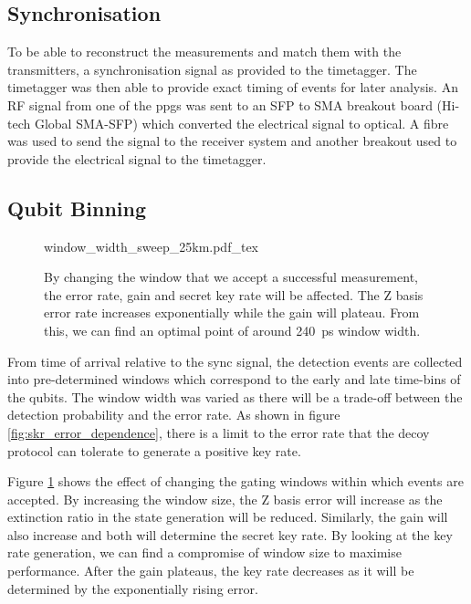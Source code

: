 
\subsection{Synchronisation}

To be able to reconstruct the measurements and match them with the transmitters, a synchronisation signal as provided to the timetagger. The timetagger was then able to provide exact timing of events for later analysis. An RF signal from one of the \acp{ppg} was sent to an SFP to SMA breakout board (Hi-tech Global SMA-SFP) which converted the electrical signal to optical. A fibre was used to send the signal to the receiver system and another breakout used to provide the electrical signal to the timetagger. 

\subsection{Qubit Binning}

\begin{figure}[t]
	\centering
	\tiny
	\def\svgwidth{\textwidth} 
	{window_width_sweep_25km.pdf_tex}
	\caption[Error, gain and key rate dependence on bin width]{By changing the window that we accept a successful measurement, the error rate, gain and secret key rate will be affected. The Z basis error rate increases exponentially while the gain will plateau. From this, we can find an optimal point of around \SI{240}{\ps} window width.}
	\label{fig:window_sweep}
\end{figure}

From time of arrival relative to the sync signal, the detection events are collected into pre-determined windows which correspond to the early and late time-bins of the qubits. The window width was varied as there will be a trade-off between the detection probability and the error rate. As shown in figure \ref{fig:skr_error_dependence}, there is a limit to the error rate that the decoy protocol can tolerate to generate a positive key rate.

Figure \ref{fig:window_sweep} shows the effect of changing the gating windows within which events are accepted. By increasing the window size, the Z basis error will increase as the extinction ratio in the state generation will be reduced. Similarly, the gain will also increase and both will determine the secret key rate. By looking at the key rate generation, we can find a compromise of window size to maximise performance. After the gain plateaus, the key rate decreases as it will be determined by the exponentially rising error.

